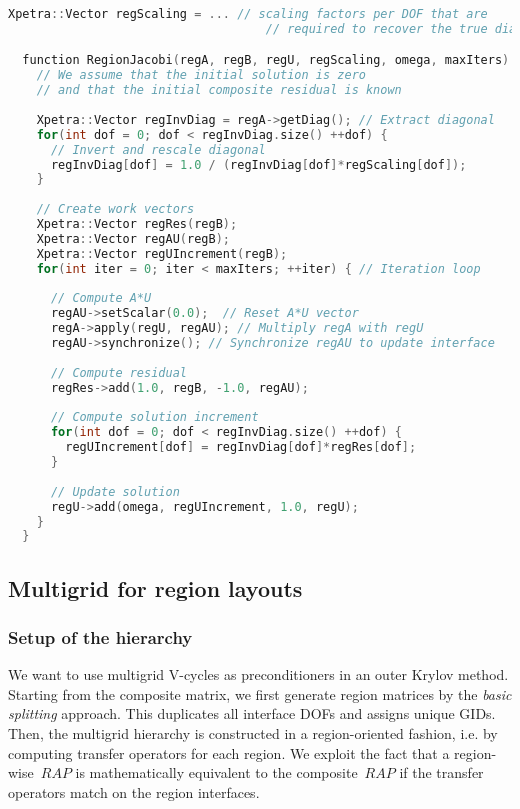 \documentclass[11pt]{article}
\begin{document}
\begin{lstlisting}[language=c++]
	Xpetra::Vector regScaling = ... // scaling factors per DOF that are 
	                                // required to recover the true diagonal

  function RegionJacobi(regA, regB, regU, regScaling, omega, maxIters) {
    // We assume that the initial solution is zero 
    // and that the initial composite residual is known
    
    Xpetra::Vector regInvDiag = regA->getDiag(); // Extract diagonal
    for(int dof = 0; dof < regInvDiag.size() ++dof) {
      // Invert and rescale diagonal
      regInvDiag[dof] = 1.0 / (regInvDiag[dof]*regScaling[dof]);
    }
    
    // Create work vectors
    Xpetra::Vector regRes(regB);
    Xpetra::Vector regAU(regB);
    Xpetra::Vector regUIncrement(regB);
    for(int iter = 0; iter < maxIters; ++iter) { // Iteration loop
      
      // Compute A*U
      regAU->setScalar(0.0);  // Reset A*U vector
      regA->apply(regU, regAU); // Multiply regA with regU
      regAU->synchronize(); // Synchronize regAU to update interface
      
      // Compute residual
      regRes->add(1.0, regB, -1.0, regAU);
      
      // Compute solution increment
      for(int dof = 0; dof < regInvDiag.size() ++dof) {
        regUIncrement[dof] = regInvDiag[dof]*regRes[dof];
      }
      
      // Update solution
      regU->add(omega, regUIncrement, 1.0, regU);
    }
  }
\end{lstlisting}

\subsection{Multigrid for region layouts}

\subsubsection{Setup of the hierarchy}

We want to use multigrid V-cycles as preconditioners in an outer Krylov method. Starting from the composite matrix,
we first generate region matrices by the {\em basic splitting} approach. 
This duplicates all interface DOFs and assigns unique GIDs. 
Then, the multigrid hierarchy is constructed in a region-oriented fashion, i.e. by computing transfer operators for each region. 
We exploit the fact that a region-wise~$RAP$ is mathematically equivalent to the composite~$RAP$ 
if the transfer operators match on the region interfaces.
\end{document}
